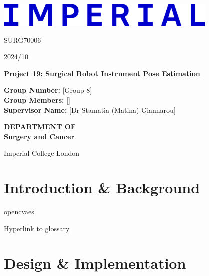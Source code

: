 \documentclass[12pt]{article}
\begin{document}
\begin{titlepage}
      \centering

      \includegraphics[width=0.8\textwidth]{Imperial_College_London_new_logo.png} %
      \vspace*{1cm}

      \Large
      SURG70006

      \large
      2024/10

      \vspace{0.5cm}
      \Huge
      \textbf{Project 19: Surgical Robot Instrument Pose Estimation }

      \vspace{1.5cm}


      \begin{mdframed}
            \normalsize %
            \textbf{Group Number:} [Group 8]\\[20pt] %
            \textbf{Group Members:} []\\[20pt] %
            \textbf{Supervisor Name:} [Dr Stamatia (Matina) Giannarou] %
      \end{mdframed}

      \vspace{2cm} %
      \Large
      \textbf{DEPARTMENT OF}\\
      \vspace{0.1cm} %
      \textbf{Surgery and Cancer}

      \vspace{4cm} %
      \large
      Imperial College London\\
      


\end{titlepage}

\newpage

\section{Introduction \& Background}
\gls{opencv}\gls{aes}

\hyperref[sec:glossary]{Hyperlink to glossary} %
\section{Design \& Implementation}






\printbibliography
\printglossaries
\label{sec:glossary}
\end{document}

